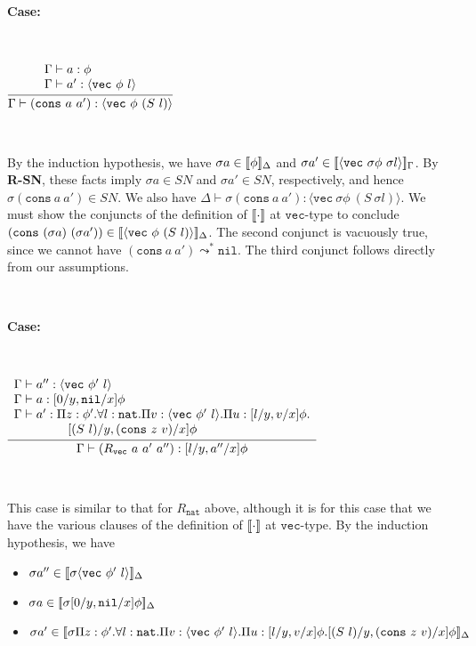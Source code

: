 \documentclass[copyright]{eptcs}
\newcommand{\SN}[0]{\textit{SN}}
\newcommand{\vc}[0]{\texttt{vec}}
\newcommand{\nat}[0]{\texttt{nat}}
\newcommand{\nil}[0]{\texttt{nil}}
\newcommand{\cons}[0]{\texttt{cons}}
\newcommand{\interp}[1]{[\negthinspace[#1]\negthinspace]}
\begin{document}
\ 

\noindent \textbf{Case:}

\

$\infer{\Gamma\vdash (\cons\ a\ a'):\langle \vc\ \phi\ (S\ l)\rangle}
      {\begin{array}{l}\Gamma\vdash a:\phi \\ \Gamma \vdash a':\langle \vc\ \phi\ l\rangle
       \end{array}}$

\ 

\noindent By the induction hypothesis, we have $\sigma
a\in\interp{\phi}_\Delta$ and $\sigma a'\in\interp{\langle\vc\ \sigma
  \phi\ \sigma l\rangle}_\Gamma$.  By \textbf{R-SN}, these facts imply
$\sigma a\in\SN$ and $\sigma a'\in\SN$, respectively, and hence
$\sigma(\cons\ a\ a')\in\SN$.  We also have $\Delta\vdash
\sigma(\cons\ a\ a'):\langle\vc\ \sigma \phi\ (S\ \sigma l)\rangle$.
We must show the conjuncts of the definition of $\interp{\cdot}$ at
$\vc$-type to conclude $(\cons\ (\sigma a)\ (\sigma
a'))\in\interp{\langle \vc\ \phi\ (S\ l)\rangle}_\Delta$.  The second
conjunct is vacuously true, since we cannot have
$(\cons\ a\ a')\leadsto^*\nil$. The third conjunct follows directly
from our assumptions.

\ 

\noindent \textbf{Case:}

\

$\infer{\Gamma\vdash (R_\vc\ a\ a'\ a''):[l/y, a''/x]\phi}
      {\begin{array}{l}\Gamma \vdash a'' : \langle \vc\ \phi'\ l\rangle \\
       \Gamma \vdash a : [0/y,\nil/x]\phi \\
       \Gamma \vdash a' : \Pi z:\phi'. \forall l:\nat. \Pi v :\langle \vc\ \phi'\ l\rangle. \Pi u : [l/y, v/x]\phi. \\
        \ \ \ \ \ \ \ \ \ \ \ \ \  [(S\ l)/y, (\cons\ z\ v)/x]\phi
       \end{array}}$

\ 

\noindent This case is similar to that for $R_\nat$ above, although it
is for this case that we have the various clauses of the definition of
$\interp{\cdot}$ at $\vc$-type.  By the induction hypothesis, we have
\begin{itemize}
\item $\sigma a''\in\interp{\sigma\langle \vc\ \phi'\ l\rangle}_\Delta$
\item $\sigma a\in\interp{\sigma[0/y,\nil/x]\phi}_\Delta$
\item $\sigma a'\in\interp{\sigma\Pi z:\phi'. \forall l:\nat. \Pi v :\langle \vc\ \phi'\ l\rangle. \Pi u : [l/y, v/x]\phi.[(S\ l)/y, (\cons\ z\ v)/x]\phi}_\Delta$
\end{itemize}
\end{document}
